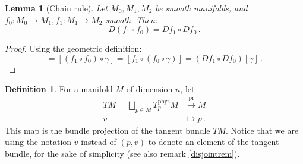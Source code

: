 \documentclass[a4paper,11pt,titlepage, article, oneside]{memoir}
\numberwithin{equation}{section}
\newtheorem{lemma}[theorem]{Lemma}
\theoremstyle{definition}
\newtheorem{definition}[theorem]{Definition}
\theoremstyle{remark}
\newcommand{\tangentphys}[1]{T_{#1}^{\text{phys}}}
\begin{document}
\begin{lemma}[Chain rule]
Let $M_0, M_1, M_2$ be smooth manifolds, and $f_0 \colon M_0 \rightarrow M_1, f_1 \colon M_1 \rightarrow M_2$ smooth. Then:
\[ D(f_1 \circ f_0) = Df_1 \circ Df_0 \, . \]
\end{lemma}
\begin{proof}
Using the geometric definition:
\begin{equation*}
[D(f_1 \circ f_0)][\gamma] = [(f_1 \circ f_0) \circ \gamma] = [f_1 \circ (f_0 \circ \gamma)] = (Df_1 \circ Df_0)[\gamma] \, .
\end{equation*}
\end{proof}

\begin{definition}
For a manifold $M$ of dimension $n$, let 
\begin{align}
TM = \bigsqcup_{p \in M} \tangentphys{p} M & \overset{\text{pr}}{\longrightarrow} M \\
v &\longmapsto p \, . \nonumber
\end{align}
This map is the bundle projection of the tangent bundle $TM$. Notice that we are using the notation $v$ instead of $(p, v)$ to denote an element of the tangent bundle, for the sake of simplicity (see also remark \ref{disjointrem}).
\end{definition}
\end{document}
